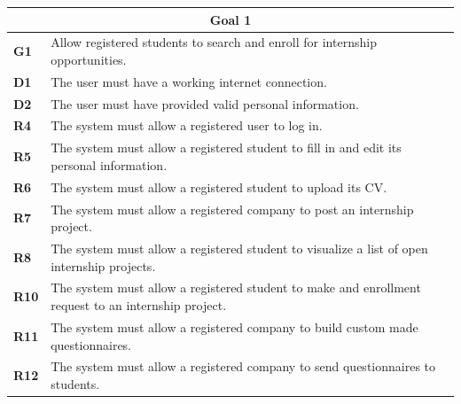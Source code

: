 \begin{table}[H]
    \centering
    \begin{tabular}{|l|m{10cm}|}
        \hline \multicolumn{2}{|c|}{\textbf{Goal 1}} \\
        \hline \textbf{G1} & Allow registered students to search and enroll for internship opportunities. \\
        \hline \textbf{D1} & The user must have a working internet connection. \\
        \hline \textbf{D2} & The user must have provided valid personal information. \\
        \hline \textbf{R4} & The system must allow a registered user to log in. \\
        \hline \textbf{R5} & The system must allow a registered student to fill in and edit its personal information. \\
        \hline \textbf{R6} & The system must allow a registered student to upload its CV. \\
        \hline \textbf{R7} & The system must allow a registered company to post an internship project. \\
        \hline \textbf{R8} & The system must allow a registered student to visualize a list of open internship projects. \\
        \hline \textbf{R10} & The system must allow a registered student to make and enrollment request to an internship project. \\
        \hline \textbf{R11} & The system must allow a registered company to build custom made questionnaires. \\
        \hline \textbf{R12} & The system must allow a registered company to send questionnaires to students. \\

\end{tabular}
\end{table}
